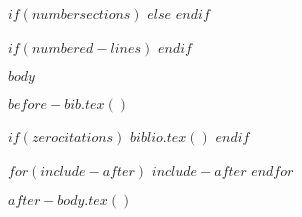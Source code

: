 $if(numbersections)$
\setcounter{secnumdepth}{$if(secnumdepth)$$secnumdepth$$else$5$endif$}
$else$
\setcounter{secnumdepth}{-\maxdimen} %
$endif$

\setlength\LTleft{0pt}

$if(numbered-lines)$
\resetlinenumber[1]
$endif$



$body$

$before-bib.tex()$

$if(zerocitations)$
$biblio.tex()$
$endif$

$for(include-after)$
$include-after$
$endfor$

$after-body.tex()$


